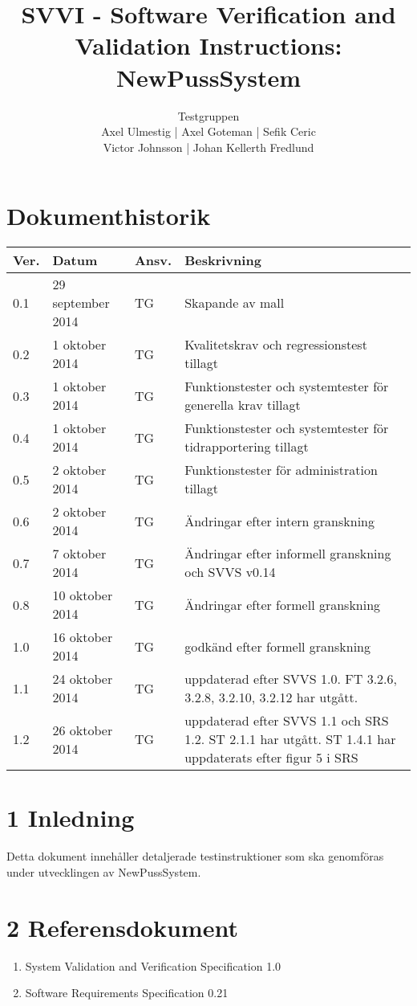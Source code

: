 \documentclass[a4paper]{article}
\title{SVVI - Software Verification and Validation Instructions: NewPussSystem}
\author{Testgruppen \\ Axel Ulmestig | Axel Goteman | Sefik Ceric \\ Victor Johnsson | Johan Kellerth Fredlund}
\date{}
\begin{document}
\maketitle
\thispagestyle{fancy}
\tableofcontents
\newpage

\section*{Dokumenthistorik}

\begin{tabular}{ l l l p{9cm} }
Ver. & Datum & Ansv. & Beskrivning \\\hline
0.1 & 29 september 2014 & TG & Skapande av mall \\
0.2 & 1 oktober 2014 & TG & Kvalitetskrav och regressionstest tillagt \\
0.3 & 1 oktober 2014 & TG & Funktionstester och systemtester för generella krav tillagt\\
0.4 & 1 oktober 2014 & TG & Funktionstester och systemtester för tidrapportering tillagt\\
0.5 & 2 oktober 2014 & TG & Funktionstester för administration tillagt\\
0.6 & 2 oktober 2014 & TG & Ändringar efter intern granskning\\
0.7 & 7 oktober 2014 & TG & Ändringar efter informell granskning och SVVS v0.14\\
0.8 & 10 oktober 2014 & TG & Ändringar efter formell granskning\\
1.0 & 16 oktober 2014 & TG & godkänd efter formell granskning\\
1.1 & 24 oktober 2014 & TG & uppdaterad efter SVVS 1.0. FT 3.2.6, 3.2.8, 3.2.10, 3.2.12 har utgått. \\
1.2 & 26 oktober 2014 & TG & uppdaterad efter SVVS 1.1 och SRS 1.2. ST 2.1.1 har utgått. ST 1.4.1 har uppdaterats efter figur 5 i SRS\\

\end{tabular}
\section{1 Inledning}       

Detta dokument innehåller detaljerade testinstruktioner som ska genomföras under utvecklingen av NewPussSystem.

\section{2 Referensdokument}
\begin{enumerate}
\item System Validation and Verification Specification 1.0
\item Software Requirements Specification 0.21
\end{enumerate}
\end{document}
